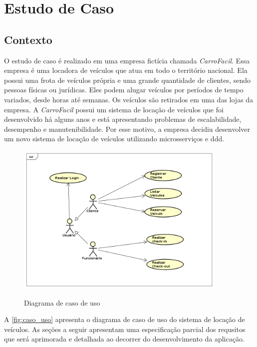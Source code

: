 \section{Estudo de Caso}

\subsection{Contexto}
\label{section:contexto}
O estudo de caso é realizado em uma empresa fictícia chamada \emph{CarroFacil}. Essa empresa é uma locadora de veículos que atua em todo o território nacional. Ela possui uma frota de veículos própria e uma grande quantidade de clientes, sendo pessoas físicas ou jurídicas. Eles podem alugar veículos por períodos de tempo variados, desde horas até semanas. Os veículos são retirados em uma das lojas da empresa. A \emph{CarroFacil} possui um sistema de locação de veículos que foi desenvolvido há alguns anos e está apresentando problemas de escalabilidade, desempenho e manutenibilidade. Por esse motivo, a empresa decidiu desenvolver um novo sistema de locação de veículos utilizando microsserviços e \acrshort{ddd}.

\begin{figure}[!h]
    \centering
    \caption{Diagrama de caso de uso}
    \includegraphics[width=0.9\textwidth]{media/diagrama_usecase.png}
    \label{fig:caso_uso}
\end{figure}

A \autoref{fig:caso_uso} apresenta o diagrama de caso de uso do sistema de locação de veículos. As seções a seguir apresentam uma especificação parcial dos requsitos que será aprimorada e detalhada ao decorrer do desenvolvimento da aplicação.

